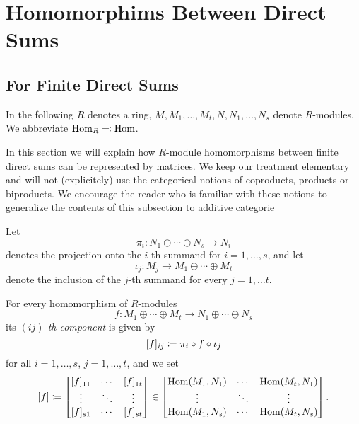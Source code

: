 \section{Homomorphims Between Direct Sums}
\label{appendix: homomorphisms between direct sums}





\subsection{For Finite Direct Sums}


\begin{conventions}
  In the following $R$ denotes a ring, $M, M_1, \dotsc, M_t, N, N_1, \dotsc, N_s$ denote $R$-modules.
  We abbreviate $\operatorname{Hom}_R \eqqcolon \operatorname{Hom}$.
\end{conventions}


\begin{fluff}
  In this section we will explain how $R$-module homomorphisms between finite direct sums can be represented  by matrices.
  We keep our treatment elementary and will not (explicitely) use the categorical notions of coproducts, products or biproducts.
  We encourage the reader who is familiar with these notions to generalize the contents of this subsection to additive categorie
\end{fluff}


\begin{fluff}
  Let
  \[
          \pi_i
  \colon  N_1 \oplus \dotsb \oplus N_s
  \to     N_i
  \]
  denotes the projection onto the $i$-th summand for $i = 1, \dotsc, s$, and let
  \[
            \iota_j
    \colon  M_j
    \to     M_1 \oplus \dotsb \oplus M_t
  \]
  denote the inclusion of the $j$-th summand for every $j = 1, \dotsc t$.
\end{fluff}


\begin{definition}
  For every homomorphism of $R$-modules
  \[
            f
    \colon  M_1 \oplus \dotsb \oplus M_t
    \to     N_1 \oplus \dotsb \oplus N_s
  \]
  its \emph{$(ij)$-th component} is given by
  \[
              [f]_{ij}
    \coloneqq  \pi_i \circ f \circ \iota_j
  \]
  for all $i = 1, \dotsc, s$, $j = 1, \dotsc, t$, and we set
  \[
              [f]
    \coloneqq  \begin{bmatrix}
                [f]_{11}  & \cdots  & [f]_{1t}  \\
                \vdots    & \ddots  & \vdots    \\
                [f]_{s1}  & \cdots  & [f]_{st}
              \end{bmatrix}
    \in       \begin{bmatrix}
                \operatorname{Hom}(M_1, N_1)  & \cdots  & \operatorname{Hom}(M_t, N_1)  \\
                \vdots          & \ddots  & \vdots          \\
                \operatorname{Hom}(M_1, N_s)  & \cdots  & \operatorname{Hom}(M_t, N_s)
              \end{bmatrix}.
  \]
\end{definition}


